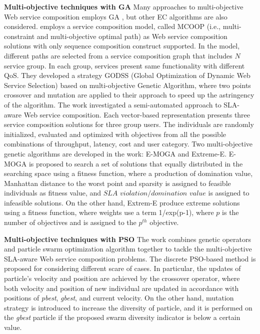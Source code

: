 \textbf{Multi-objective techniques with GA} Many approaches to multi-objective Web service composition employs GA \cite{liu2005dynamic}, but other EC algorithms are also considered.  \cite{liu2005dynamic} employs a service composition model, called  MCOOP (i.e., multi-constraint and multi-objective optimal path) as Web service composition solutions with only sequence composition construct supported. In the model, different paths are selected from a service composition graph that includes $N$ service group. In each group, services present same functionality with different QoS. They developed a strategy GODSS (Global Optimization of Dynamic Web Service Selection) based on multi-objective Genetic Algorithm, where two points crossover and mutation are applied to their approach to speed up the astringency of the algorithm. The work \cite{wada2012e3} investigated a semi-automated approach to SLA-aware Web service composition.  Each vector-based representation presents three service composition solutions for three group users.  The individuals are randomly initialized, evaluated and optimized with objectives from all the possible combinations of throughput, latency, cost and user category. Two multi-objective genetic algorithms are developed in the work: E-MOGA and Extreme-E. E-MOGA is proposed to search a set of solutions that equally distributed in the searching space using a fitness function, where a production of domination value,  Manhattan distance to the worst point and sparsity is assigned to feasible individuals as fitness value, and $SLA$ $violation /domination$ $value$ is assigned to infeasible solutions. On the other hand, Extrem-E produce extreme solutions using a fitness function, where weights use a term 1/exp(p-1), where $p$ is the number of objectives and is assigned to the $p^{th}$ objective.

\textbf{Multi-objective techniques with PSO} The work \cite{yin2014hybrid} combines genetic operators and particle swarm optimization algorithm together to tackle the multi-objective SLA-aware Web service composition problems. The discrete PSO-based method is proposed for  considering different scare of cases. In particular, the updates of particle's velocity and position are achieved by the crossover operator, where both velocity and position of new individual are updated in accordance with positions of \textit{pbest}, \textit{gbest}, and current velocity. On the other hand, mutation strategy is introduced to increase the diversity of particle, and it is performed on the \textit{gbest} particle if the proposed swarm diversity indicator is below a certain value.

